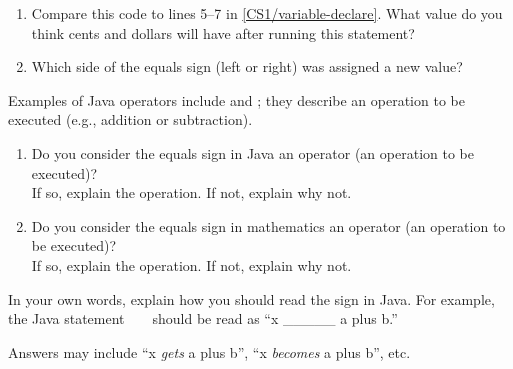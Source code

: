 \begin{enumerate}

\item Compare this code to lines 5--7 in \ref{CS1/variable-declare}.
What value do you think cents and dollars will have after running this statement?


\item Which side of the equals sign (left or right) was assigned a new value?

\end{enumerate}


\Q Examples of Java operators include \java{+} and \java{-}; they describe an operation to be executed (e.g., addition or subtraction).

\begin{enumerate}

\item Do you consider the equals sign in Java an operator (an operation to be executed)?
\\ If so, explain the operation. If not, explain why not.


\item Do you consider the equals sign in mathematics an operator (an operation to be executed)?
\\ If so, explain the operation. If not, explain why not.


\end{enumerate}


\Q In your own words, explain how you should read the \java{=} sign in Java.
For example, the Java statement ~  ~ should be read as ``x \_\_\_\_\_ a plus b.''

\begin{answer}
Answers may include ``x \emph{gets} a plus b'', ``x \emph{becomes} a plus b'', etc.
\end{answer}
